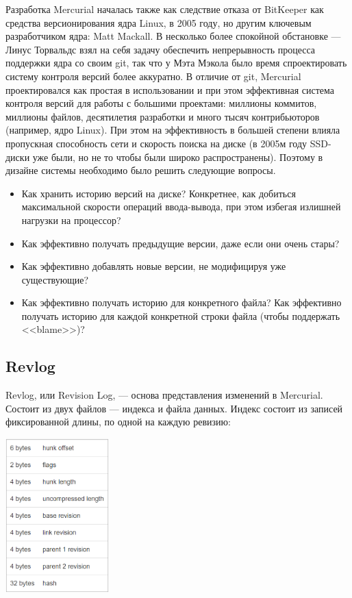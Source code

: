 \documentclass{../../text-style}
\begin{document}
Разработка Mercurial началась также как следствие отказа от BitKeeper как средства версионирования ядра Linux, в 2005 году, но другим ключевым разработчиком ядра: Matt Mackall. В несколько более спокойной обстановке --- Линус Торвальдс взял на себя задачу обеспечить непрерывность процесса поддержки ядра со своим git, так что у Мэта Мэкола было время спроектировать систему контроля версий более аккуратно. В отличие от git, Mercurial проектировался как простая в использовании и при этом эффективная система контроля версий для работы с большими проектами: миллионы коммитов, миллионы файлов, десятилетия разработки и много тысяч контрибьюторов (например, ядро Linux). При этом на эффективность в большей степени влияла пропускная способность сети и скорость поиска на диске (в 2005м году SSD-диски уже были, но не то чтобы были широко распространены). Поэтому в дизайне системы необходимо было решить следующие вопросы.

\begin{itemize}
    \item Как хранить историю версий на диске? Конкретнее, как добиться максимальной скорости операций ввода-вывода, при этом избегая излишней нагрузки на процессор?
    \item Как эффективно получать предыдущие версии, даже если они очень стары?
    \item Как эффективно добавлять новые версии, не модифицируя уже существующие?
    \item Как эффективно получать историю для конкретного файла? Как эффективно получать историю для каждой конкретной строки файла (чтобы поддержать <<blame>>)?
\end{itemize}

\subsection{Revlog}

Revlog, или Revision Log, --- основа представления изменений в Mercurial. Состоит из двух файлов --- индекса и файла данных. Индекс состоит из записей фиксированной длины, по одной на каждую ревизию:

\begin{center}
    \includegraphics[width=0.3\textwidth]{revlog.png}
\end{center}
\end{document}

